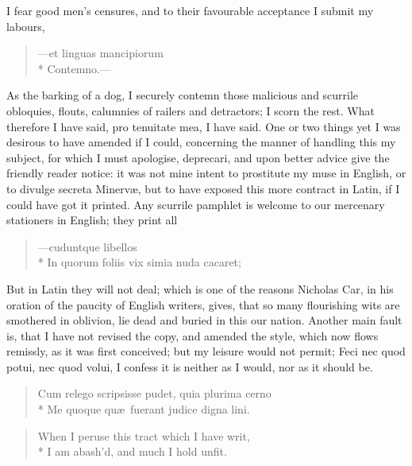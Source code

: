 {I fear good men's censures, and to their favourable acceptance I submit
my labours,

\begin{verse}
\textlatin{---et linguas mancipiorum}\\*
\textlatin{Contemno.}---
\end{verse}

As the barking of a dog, I securely contemn those malicious and
scurrile obloquies, flouts, calumnies of railers and detractors; I
scorn the rest. What therefore I have said, pro tenuitate mea, I have
said.
One or two things yet I was desirous to have amended if I could,
concerning the manner of handling this my subject, for which I must
apologise, deprecari, and upon better advice give the friendly reader
notice: it was not mine intent to prostitute my muse in English, or to
divulge secreta Minerv\ae{}, but to have exposed this more contract in
Latin, if I could have got it printed. Any scurrile pamphlet is welcome
to our mercenary stationers in English; they print all

\begin{verse}
---\textlatin{cuduntque libellos}\\*
\textlatin{In quorum foliis vix simia nuda cacaret};
\end{verse}

But in Latin they will not deal; which is one of the reasons
Nicholas Car, in his oration of the paucity of English writers,
gives, that so many flourishing wits are smothered in oblivion, lie
dead and buried in this our nation. Another main fault is, that I have
not revised the copy, and amended the style, which now flows remissly,
as it was first conceived; but my leisure would not permit; Feci nec
quod potui, nec quod volui, I confess it is neither as I would, nor as
it should be.

\begin{verse}
\textlatin{Cum relego scripsisse pudet, quia plurima cerno}\\*
\textlatin{Me quoque qu\ae{}\ fuerant judice digna lini.}
\end{verse}

\begin{verse}
When I peruse this tract which I have writ,\\*
I am abash'd, and much I hold unfit.
\end{verse}

}
